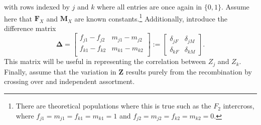 \documentclass[sts]{imsart}
\newcommand{\ve}[1]{\mathbf{#1}}           %
\newcommand{\m}[1]{\mathbf{#1}}               %
\newcommand{\sm}[1]{\boldsymbol{#1}}   %
\begin{document}
with rows indexed by $j$ and $k$ where all entries are once again in $\{0,1\}$. Assume here that $\m{F}_X$ and $\m{M}_X$ are known constants.\footnote{There are theoretical populations where this is true such as the $F_2$ intercross, where $f_{j1} = m_{j1} = f_{k1} = m_{k1} = 1$ and $f_{j2} = m_{j2} = f_{k2} = m_{k2} = 0$.} Additionally, introduce the difference matrix
\begin{equation} \label{eq:diffMatrix}
  \sm{\Delta} = \begin{bmatrix}
    f_{j1} - f_{j2} & m_{j1} - m_{j2} \\
    f_{k1} - f_{k2} & m_{k1} - m_{k2} \\
  \end{bmatrix} := \begin{bmatrix}
    \delta_{jF} & \delta_{jM} \\
    \delta_{kF} & \delta_{kM}
  \end{bmatrix}.
\end{equation}
This matrix will be useful in representing the correlation between $Z_j$ and $Z_k$.
Finally, assume that the variation in $\ve{Z}$ results purely from the recombination by crossing over and independent assortment.
\end{document}
